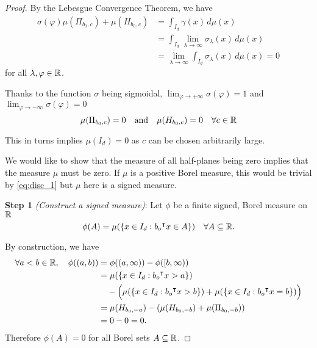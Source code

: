 \begin{proof}
    By the Lebesgue Convergence Theorem, we have
    \begin{align*}
        \sigma(\varphi) \mu(\Pi_{b_0, c}) + \mu (H_{b_0, c})
        &= \int_{I_d} \gamma(x) \,d\mu(x) \\
        &= \int_{I_d} \lim_{\lambda\to\infty} \sigma_{\lambda}(x)\,d\mu(x) \\
        &= \lim_{\lambda\to\infty} \int_{I_d} \sigma_{\lambda}(x)\,d\mu(x) = 0
    \end{align*}
    for all $\lambda, \varphi \in \mathbb{R}$.

    Thanks to the function $\sigma$ being sigmoidal, $\lim_{\varphi\to +\infty}
    \sigma(\varphi)= 1$ and $\lim_{\varphi\to -\infty} \sigma(\varphi)=0$
    \begin{equation}
        \label{eq:disc_1}
        \mu(\Pi_{b_0, c}) = 0 \quad \text{and} \quad \mu (H_{b_0, c}) = 0 
        \quad \forall c\in\mathbb{R}
    \end{equation}

    This in turns implies $\mu(I_d) = 0$ as $c$ can be chosen arbitrarily large.
    
    We would like to show that the measure of all half-planes being zero implies
    that the measure $\mu$ must be zero. If $\mu$ is a positive Borel measure,
    this would be trivial by \eqref{eq:disc_1} but $\mu$ here is a signed
    measure.
    
    \textbf{Step 1} \textit{(Construct a signed measure)}: Let $\phi$ be a
    finite signed, Borel measure on $\mathbb{R}$
    \begin{equation}
        \label{eq:disc_2}
        \phi(A) = \mu(\{x \in I_d: b_o{}^{\intercal} x \in A\}) \quad \forall A \subseteq \mathbb{R}.
    \end{equation}

    By construction, we have
    \begin{align}
        \forall a < b \in \mathbb{R}, \quad \phi((a,b)) 
        &= \phi((a,\infty)) - \phi([b, \infty)) \\
        &= \mu(\{x \in I_d: b_o{}^{\intercal} x > a\}) \\
        &\quad- \Big(
            \mu(\{x \in I_d: b_o{}^{\intercal} x > b\})
            + \mu(\{x \in I_d: b_o{}^{\intercal} x = b\})
        \Big) \\
        &= \mu(H_{b_0, -a}) - (\mu(H_{b_0, -b}) + \mu(\Pi_{b_0, -b})) \\
        &= 0 - 0 = 0.
    \end{align}
    Therefore $\phi(A) = 0$ for all Borel sets $A \subseteq \mathbb{R}$.


\end{proof}
